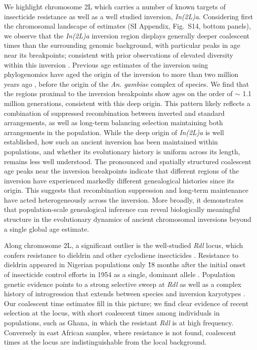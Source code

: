 \documentclass[9pt,twocolumn,twoside]{pnas-new}
\begin{document}
We highlight chromosome 2L which carries a number of known targets
of insecticide resistance as well as a well studied inversion, \emph{In(2L)a}. 
Considering first the chromosomal landscape of estimates (SI Appendix, Fig.~S14,
bottom panels), we observe that the \emph{In(2L)a} inversion region displays generally deeper coalescent times
than the surrounding genomic background, with particular peaks in age near its breakpoints;
consistent with prior observations of elevated diversity within this inversion \cite{love2016chromosomal}. 
Previous age estimates of the inversion using phylogenomics have aged the origin of the
inversion to more than two million years ago \cite{fontaine2015extensive},
before the origin of the \emph{An. gambiae} complex of species.
We find that the regions proximal to the inversion breakpoints show ages on the order of $\sim$ 1.1 million generations, consistent with this deep origin.
This pattern likely reflects a combination of suppressed recombination between inverted and standard arrangements, 
as well as long-term balancing selection maintaining both arrangements in the population.
While the deep origin of \emph{In(2L)a} is well established, how such an ancient inversion has been maintained within populations, and whether its evolutionary history is uniform across its length, remains less well understood. The pronounced and spatially structured coalescent age peaks near the inversion breakpoints indicate that different regions of the inversion have experienced markedly different genealogical histories since its origin. 
This suggests that recombination suppression and long-term maintenance have acted heterogeneously across the inversion.
More broadly, it demonstrates that population-scale genealogical inference can reveal biologically meaningful structure in the evolutionary dynamics of ancient chromosomal inversions beyond a single global age estimate.


Along chromosome 2L, a significant outlier is the well-studied \emph{Rdl} locus,
which confers resistance to dieldrin and other cyclodiene insecticides \cite{ffrench1993point,thompson1993conservation,du2005independent}.
Resistance to dieldrin appeared in Nigerian populations only \~18 months 
after the initial onset of insecticide control efforts in 1954 \cite{elliott1956insecticide}
as a single, dominant allele \cite{davidson1962case}.
Population genetic evidence points to a strong selective sweep at \emph{Rdl}
as well as a complex history of introgression that extends between species and inversion karyotypes \cite{grau2020evolution}.
Our coalescent time estimates fill in this picture; 
we find clear evidence of recent selection at the locus, with 
short coalescent times among individuals in populations,
such as Ghana, in which the resistant \emph{Rdl} is at high frequency.
Conversely in east African samples, where resistance is not found, 
coalescent times at the locus are indistinguishable from the local background.
\end{document}
